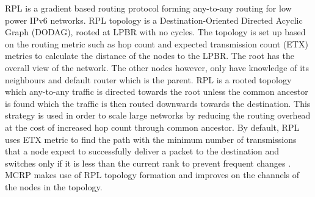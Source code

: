 RPL \cite{winter2012rpl} is a gradient based routing protocol forming any-to-any routing for low power IPv6 networks. RPL topology is a Destination-Oriented Directed Acyclic Graph (DODAG), rooted at LPBR with no cycles. The topology is set up based on the routing metric \cite{routingmetrics} such as hop count and expected transmission count (ETX) metrics to calculate the distance of the nodes to the LPBR. The root has the overall view of the network. The other nodes however, only have knowledge of its neighbours and default router which is the parent. RPL is a rooted topology which any-to-any traffic is directed towards the root unless the common ancestor is found which the traffic is then routed downwards towards the destination. This strategy is used in order to scale large networks by reducing the routing overhead at the cost of increased hop count through common ancestor. %
By default, RPL uses ETX metric to find the path with the minimum number of transmissions that a node expect to successfully deliver a packet to the destination and switches only if it is less than the current rank to prevent frequent changes \cite{mrhof}. MCRP makes use of RPL topology formation and improves on the channels of the nodes in the topology.




